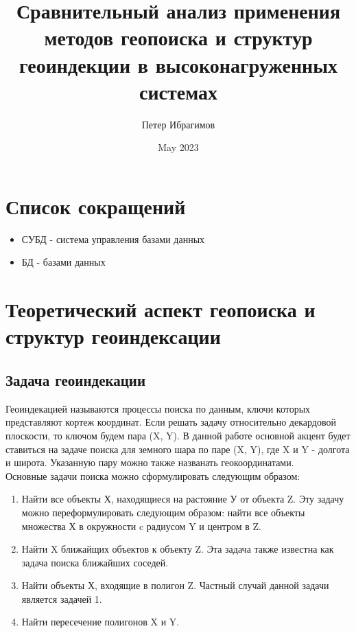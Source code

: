 \documentclass{article}
\title{Сравнительный анализ применения методов геопоиска и структур геоиндекции в высоконагруженных системах}
\author{Петер Ибрагимов}
\date{May 2023}
\begin{document}
\maketitle


\section{Список сокращений}
\begin{itemize}
    \item СУБД - система управления базами данных
    \item БД - базами данных

\end{itemize}
\section{Теоретический аспект геопоиска и структур геоиндексации}
\subsection{Задача геоиндекации}

Геоиндекацией называются процессы поиска по данным, ключи которых представляют кортеж координат. Если решать задачу относительно декардовой плоскости, то ключом будем пара (X, Y).  В данной работе основной акцент будет ставиться на задаче поиска для земного шара по паре (X, Y), где X и Y - долгота и широта. Указанную пару можно также названать геокоординатами.\\

Основные задачи поиска можно сформулировать следующим образом:
\begin{enumerate}
    \item Найти все объекты Х, находящиеся на растояние У от объекта Z. Эту задачу можно переформулировать следующим образом: найти все объекты множества Х в окружности c радиусом Y и центром в Z.
    \item Найти X ближайщих объектов к объекту Z. Эта задача также известна как задача поиска ближайших соседей.
    \item Найти объекты Х, входящие в полигон Z. Частный случай данной задачи является задачей 1.
    \item Найти пересечение полигонов X и Y.
\end{enumerate}
\end{document}
